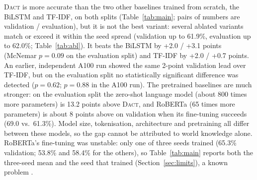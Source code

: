 \documentclass[11pt]{article}
\newcommand{\dact}{\textsc{Dact}}
\begin{document}
\dact{} is more accurate than the two other baselines trained from scratch, the BiLSTM and TF-IDF, on both splits (Table~\ref{tab:main}; pairs of numbers are validation / evaluation), but it is not the best variant: several ablated variants match or exceed it within the seed spread (validation up to 61.9\%, evaluation up to 62.0\%; Table~\ref{tab:abl}). It beats the BiLSTM by +2.0 / +3.1 points (McNemar $p{=}0.09$ on the evaluation split) and TF-IDF by +2.0 / +0.7 points. An earlier, independent A100 run showed the same 2-point validation lead over TF-IDF, but on the evaluation split no statistically significant difference was detected ($p{=}0.62$; $p{=}0.88$ in the A100 run). The pretrained baselines are much stronger: on the evaluation split the zero-shot language model (about 800 times more parameters) is 13.2 points above \dact{}, and RoBERTa (65 times more parameters) is about 8 points above on validation when its fine-tuning succeeds (69.0 vs.\ 61.3\%). Model size, tokenisation, architecture and pretraining all differ between these models, so the gap cannot be attributed to world knowledge alone. RoBERTa's fine-tuning was unstable: only one of three seeds trained (65.3\% validation; 53.8\% and 58.4\% for the others), so Table~\ref{tab:main} reports both the three-seed mean and the seed that trained (Section~\ref{sec:limits}), a known problem \cite{dodge2020finetuning}.
\end{document}
